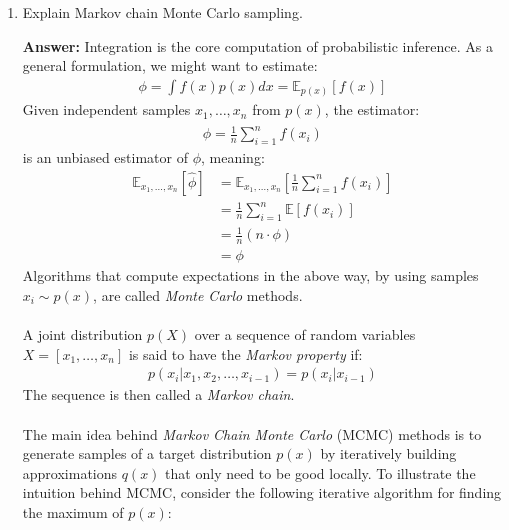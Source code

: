 \documentclass{article}
\newenvironment{QandA}{\begin{enumerate}[label=\arabic*.]}{\end{enumerate}}
\newenvironment{answer}{\par\normalfont \textbf{Answer:}}{}
\newcommand{\Exp}[1]{\mathbb{E}\left[ #1 \right]}
\newcommand{\g}{\vert}
\begin{document}
\begin{QandA}
\begin{answer}
        (Source: \href{https://web.ma.utexas.edu/users/parker/sampling/repl.htm}{University of Texas})
    \end{answer}

    \item Explain Markov chain Monte Carlo sampling.
    \begin{answer}
        Integration is the core computation of probabilistic inference. As a general formulation, we might want to estimate:
        \begin{align*}
            \phi = \int f(x) p(x) dx = \mathbb{E}_{p(x)} \left[ f(x) \right]
        \end{align*}
        Given independent samples $x_1, \ldots, x_n$ from $p(x)$, the estimator:
        \begin{align*}
            \hat{\phi} = \frac{1}{n} \sum_{i=1}^n f(x_i)
        \end{align*}
        is an unbiased estimator of $\phi$, meaning:
        \begin{align*}
            \mathbb{E}_{x_1, \ldots, x_n} \left[ \hat{\phi} \right] &= \mathbb{E}_{x_1, \ldots, x_n} \left[ \frac{1}{n} \sum_{i=1}^n f(x_i) \right] \\
            &= \frac{1}{n} \sum_{i=1}^n \Exp{f(x_i)} \\
            &= \frac{1}{n} (n \cdot \phi) \\
            &= \phi
        \end{align*}
        Algorithms that compute expectations in the above way, by using samples $x_i \sim p(x)$, are called \textit{Monte Carlo} methods. \\\\
        A joint distribution $p(X)$ over a sequence of random variables $X = \left[ x_1, \ldots, x_n \right]$ is said to have the \textit{Markov property} if:
        \begin{align*}
            p(x_i \g x_1, x_2, \ldots, x_{i-1}) = p(x_i \g x_{i-1})
        \end{align*}
        The sequence is then called a \textit{Markov chain}. \\\\
        The main idea behind \textit{Markov Chain Monte Carlo} (MCMC) methods is to generate samples of a target distribution $p(x)$ by iteratively building approximations $q(x)$ that only need to be good locally. To illustrate the intuition behind MCMC, consider the following iterative algorithm for finding the maximum of $p(x)$:
        \begin{itemize}

\end{itemize}
\end{answer}
\end{QandA}
\end{document}
